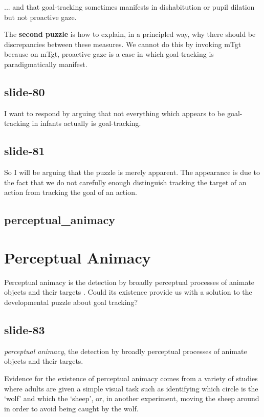 \documentclass[12pt,\papersize]{extarticle}
\begin{document}
... and that goal-tracking sometimes manifests in dishabitution or pupil dilation but not proactive gaze.
 
The \textbf{second puzzle} is how to explain, in a principled way, why there should be discrepancies
between these measures. We cannot do this by invoking mTgt because on mTgt, proactive gaze is a
case in which goal-tracking is paradigmatically manifest.
 
\subsection{slide-80}
I want to respond by arguing that not everything which appears to be goal-tracking in infants
actually is goal-tracking.
 
\subsection{slide-81}
So I will be arguing that the puzzle is merely apparent.
The appearance is due to the fact that we do not carefully enough distinguish tracking
the target of an action from tracking the goal of an action.
 
\subsection{perceptual\_animacy}
 
 
\section{Perceptual Animacy}
 
Perceptual animacy is
the detection by broadly perceptual processes of animate objects and their targets
\citet[e.g.][]{gao:2009_psychophysics}.
Could its existence provide us with a solution to the developmental puzzle about 
goal tracking?
 
\subsection{slide-83}
\emph{perceptual animacy},
the detection by broadly perceptual processes of animate objects and their targets.
 
Evidence for the existence of perceptual animacy comes from a variety of studies 
where adults are given a simple visual task such as identifying which circle is the ‘wolf’
and which the ‘sheep’, or, in another experiment, moving the sheep around in order to 
avoid being caught by the wolf.
 
\end{document}
